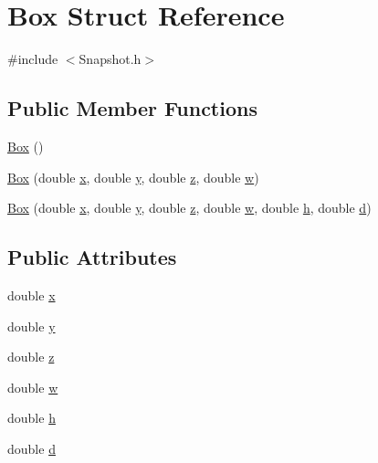 \hypertarget{structBox}{}\section{Box Struct Reference}
\label{structBox}


{\ttfamily \#include $<$Snapshot.\+h$>$}

\subsection*{Public Member Functions}
\begin{DoxyCompactItemize}
\item 
\hyperlink{structBox_aca78d7db44972bfa78d46b7bbc8796f6}{Box} ()
\item 
\hyperlink{structBox_aa8e9518bc21db23d43bac103a51004af}{Box} (double \hyperlink{structBox_a3527f292bb4bde18936b2dfc76097ea0}{x}, double \hyperlink{structBox_a4a11736337f490a1e0903c4f12badf05}{y}, double \hyperlink{structBox_adfc8262c4a354b354ef319e592980138}{z}, double \hyperlink{structBox_a52c7a693671af3a6b9e713c989c28a1b}{w})
\item 
\hyperlink{structBox_ac1f84c8bc4b686e4a20868a82e82a6b6}{Box} (double \hyperlink{structBox_a3527f292bb4bde18936b2dfc76097ea0}{x}, double \hyperlink{structBox_a4a11736337f490a1e0903c4f12badf05}{y}, double \hyperlink{structBox_adfc8262c4a354b354ef319e592980138}{z}, double \hyperlink{structBox_a52c7a693671af3a6b9e713c989c28a1b}{w}, double \hyperlink{structBox_a6ddf8580fc6085be5311720212d966f0}{h}, double \hyperlink{structBox_a512cdd18477dcf4b59df213935b9ad9d}{d})
\end{DoxyCompactItemize}
\subsection*{Public Attributes}
\begin{DoxyCompactItemize}
\item 
double \hyperlink{structBox_a3527f292bb4bde18936b2dfc76097ea0}{x}
\item 
double \hyperlink{structBox_a4a11736337f490a1e0903c4f12badf05}{y}
\item 
double \hyperlink{structBox_adfc8262c4a354b354ef319e592980138}{z}
\item 
double \hyperlink{structBox_a52c7a693671af3a6b9e713c989c28a1b}{w}
\item 
double \hyperlink{structBox_a6ddf8580fc6085be5311720212d966f0}{h}
\item 
double \hyperlink{structBox_a512cdd18477dcf4b59df213935b9ad9d}{d}
\end{DoxyCompactItemize}


